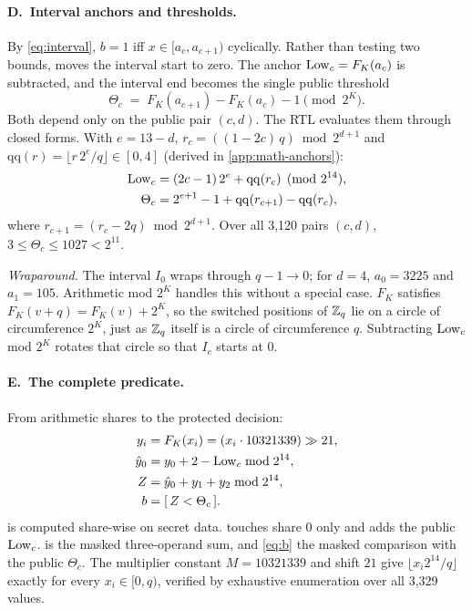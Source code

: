 \paragraph{D.~Interval anchors and thresholds.}
By \cref{eq:interval}, $b = 1$ iff $x \in [a_c, a_{c+1})$ cyclically. Rather than testing two bounds, \PAMS{} moves the interval start to zero. The anchor $\mathrm{Low}_c = F_K(a_c)$ is subtracted, and the interval end becomes the single public threshold
\begin{equation}\label{eq:theta}
  \Theta_c \;=\; F_K(a_{c+1}) - F_K(a_c) - 1 \pmod{2^K}.
\end{equation}
Both depend only on the public pair $(c, d)$. The RTL evaluates them through closed forms. With $e = 13 - d$, $r_c = ((1 - 2c)\,q) \bmod 2^{d+1}$ and $\mathrm{qq}(r) = \lfloor r\,2^{e}/q \rfloor \in [0, 4]$ (derived in \cref{app:math-anchors}):
\begin{align}
  \mathrm{Low}_c &= (2c - 1)\, 2^{e} + \mathrm{qq}(r_c) \pmod{2^{14}}, \label{eq:low}\\
  \Theta_c &= 2^{e+1} - 1 + \mathrm{qq}(r_{c+1}) - \mathrm{qq}(r_c), \label{eq:thetaclosed}
\end{align}
where $r_{c+1} = (r_c - 2q) \bmod 2^{d+1}$.
Over all 3,120 pairs $(c, d)$, $3 \le \Theta_c \le 1027 < 2^{11}$.

\emph{Wraparound.} The interval $I_0$ wraps through $q - 1 \to 0$; for $d = 4$, $a_0 = 3225$ and $a_1 = 105$. Arithmetic mod $2^K$ handles this without a special case. $F_K$ satisfies $F_K(v + q) = F_K(v) + 2^K$, so the switched positions of $\mathbb{Z}_q$ lie on a circle of circumference $2^K$, just as $\mathbb{Z}_q$ itself is a circle of circumference $q$. Subtracting $\mathrm{Low}_c$ mod $2^K$ rotates that circle so that $I_c$ starts at 0.

\paragraph{E.~The complete predicate.} From arithmetic shares to the protected decision:
\begin{align}
  y_i &= F_K(x_i) = (x_i \cdot 10321339) \gg 21 , \label{eq:yi}\\
  \hat y_0 &= y_0 + 2 - \mathrm{Low}_c \bmod 2^{14} , \label{eq:y0}\\
  Z &= \hat y_0 + y_1 + y_2 \bmod 2^{14} , \label{eq:Z}\\
  b &= [\, Z < \Theta_c \,] . \label{eq:b}
\end{align}
 is computed share-wise on secret data.  touches share 0 only and adds the public $\mathrm{Low}_c$.  is the masked three-operand sum, and \cref{eq:b} the masked comparison with the public $\Theta_c$.
The multiplier constant $M = 10321339$ and shift $21$ give $\lfloor x_i 2^{14}/q \rfloor$ exactly for every $x_i \in [0, q)$, verified by exhaustive enumeration over all 3,329 values.

